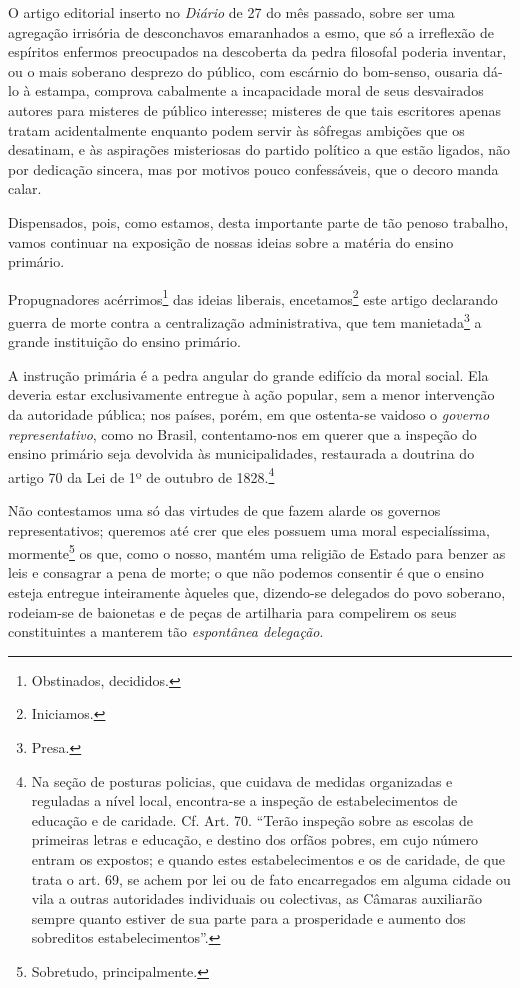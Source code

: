 O artigo editorial inserto no \emph{Diário} de 27 do mês passado, sobre
ser uma agregação irrisória de desconchavos emaranhados a esmo, que só a
irreflexão de espíritos enfermos preocupados na descoberta da pedra
filosofal poderia inventar, ou o mais soberano desprezo do público, com
escárnio do bom-senso, ousaria dá-lo à estampa, comprova cabalmente a
incapacidade moral de seus desvairados autores para misteres de público
interesse; misteres de que tais escritores apenas tratam acidentalmente
enquanto podem servir às sôfregas ambições que os desatinam, e às
aspirações misteriosas do partido político a que estão ligados, não por
dedicação sincera, mas por motivos pouco confessáveis, que o decoro
manda calar.

Dispensados, pois, como estamos, desta importante parte de tão penoso
trabalho, vamos continuar na exposição de nossas ideias sobre a matéria
do ensino primário.

Propugnadores acérrimos\footnote{Obstinados, decididos.} das ideias
liberais, encetamos\footnote{Iniciamos.} este artigo declarando guerra
de morte contra a centralização administrativa, que tem
manietada\footnote{Presa.} a grande instituição do ensino primário.

A instrução primária é a pedra angular do grande edifício da moral
social. Ela deveria estar exclusivamente entregue à ação popular, sem a
menor intervenção da autoridade pública; nos países, porém, em que
ostenta-se vaidoso o \emph{governo representativo}, como no Brasil,
contentamo-nos em querer que a inspeção do ensino primário seja
devolvida às municipalidades, restaurada a doutrina do artigo 70 da Lei
de 1º de outubro de 1828.\footnote{Na seção de posturas policias, que
  cuidava de medidas organizadas e reguladas a nível local, encontra-se
  a inspeção de estabelecimentos de educação e de caridade. Cf. Art. 70.
  ``Terão inspeção sobre as escolas de primeiras letras e educação, e
  destino dos orfãos pobres, em cujo número entram os expostos; e quando
  estes estabelecimentos e os de caridade, de que trata o art. 69, se
  achem por lei ou de fato encarregados em alguma cidade ou vila a
  outras autoridades individuais ou colectivas, as Câmaras auxiliarão
  sempre quanto estiver de sua parte para a prosperidade e aumento dos
  sobreditos estabelecimentos''.}

Não contestamos uma só das virtudes de que fazem alarde os governos
representativos; queremos até crer que eles possuem uma moral
especialíssima, mormente\footnote{Sobretudo, principalmente.} os que,
como o nosso, mantém uma religião de Estado para benzer as leis e
consagrar a pena de morte; o que não podemos consentir é que o ensino
esteja entregue inteiramente àqueles que, dizendo-se delegados do povo
soberano, rodeiam-se de baionetas e de peças de artilharia para
compelirem os seus constituintes a manterem tão \emph{espontânea
delegação}.

